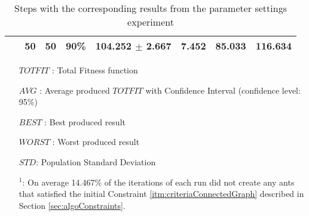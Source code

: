 \begin{table}
\begin{tabular}{|l|l|l|c||c|c|c|c|}
    ~ & 50 & 50 & \textbf{90\%} & 104.252 $\pm$ 2.667 & 7.452 & 85.033 & 116.634\\
    \hline
    \end{tabular}
    \caption {Steps with the corresponding results from the parameter settings experiment}
    \tiny
    \begin{itemize}[noitemsep]
    \item[$TOTFIT$ :] Total Fitness function
    \item[$AVG$ :] Average produced $TOTFIT$ with Confidence Interval (confidence level: 95\%)
    \item[$BEST$ :] Best produced result
    \item[$WORST$ :] Worst produced result
    \item[$STD$:] Population Standard Deviation 
    \item[$^1$:] On average 14.467\% of the iterations of each run did not create any ants that satisfied the initial Constraint \ref{itm:criteriaConnectedGraph} described in Section \vref{sec:algoConstraints}.
    \end{itemize}
    \label{table:pm1}
\end{table}

